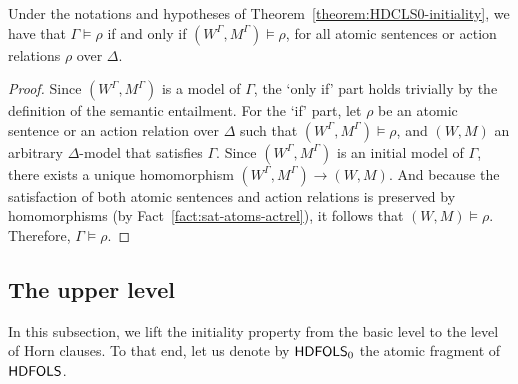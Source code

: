 \documentclass[a4paper,UKenglish,cleveref,autoref]{lipics-v2019}
\begin{document}
\begin{corollary}
  \label{corollary:HDCLS0-initiality}
  Under the notations and hypotheses of Theorem~\ref{theorem:HDCLS0-initiality}, we have that\/
  $\Gamma \models \rho$ if and only if $(W^{\Gamma}, M^{\Gamma}) \models \rho$,
  for all atomic sentences or action relations $\rho$ over $\Delta$.
\end{corollary}
\begin{proof}
  Since $(W^{\Gamma}, M^{\Gamma})$ is a model of $\Gamma$, the `only if' part holds trivially by the definition of the semantic entailment.
  For the `if' part, let $\rho$ be an atomic sentence or an action relation over $\Delta$ such that $(W^{\Gamma}, M^{\Gamma}) \models \rho$, and $(W, M)$ an arbitrary $\Delta$-model that satisfies $\Gamma$.
  Since $(W^{\Gamma}, M^{\Gamma})$ is an initial model of $\Gamma$, there exists a unique homomorphism $(W^{\Gamma}, M^{\Gamma}) \to (W, M)$.
  And because the satisfaction of both atomic sentences and action relations is preserved by homomorphisms (by Fact~\ref{fact:sat-atoms-actrel}), it follows that $(W, M) \models \rho$.
  Therefore, $\Gamma \models \rho$.
\end{proof}


\subsection{The upper level}
\label{subsection:upper-level}

In this subsection, we lift the initiality property from the basic level to the level of Horn clauses.
To that end, let us denote by ${\mathsf{HDFOLS}}_{0}$ the atomic fragment of ${\mathsf{HDFOLS}}$.
\end{document}
